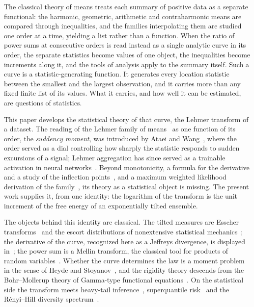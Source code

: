 \documentclass[sn-mathphys-num]{sn-jnl}
\theoremstyle{thmstyleone}%
\theoremstyle{thmstyletwo}%
\theoremstyle{thmstylethree}%
\theoremstyle{thmstyleone}%
\begin{document}
	The classical theory of means treats each summary of positive data
	as a separate functional: the harmonic, geometric, arithmetic and
	contraharmonic means are compared through inequalities, and the
	families interpolating them are studied one order at a time,
	yielding a list rather than a function. When the ratio of power sums
	at consecutive orders is read instead as a single analytic curve in
	its order, the separate statistics become values of one object, the
	inequalities become increments along it, and the tools of analysis
	apply to the summary itself. Such a curve is a statistic-generating
	function. It generates every location statistic between the smallest
	and the largest observation, and it carries more than any fixed
	finite list of its values. What it carries, and how well it can be
	estimated, are questions of statistics.
	
	This paper develops the statistical theory of that curve, the Lehmer
	transform of a dataset. The reading of the Lehmer family of
	means~\cite{lehmer1971,gini1938,hlp1934,bullen2003} as one function
	of its order, the \emph{suddency moment}, was introduced by Ataei
	and Wang~\cite{ataei2022}, where the order served as a dial
	controlling how sharply the statistic responds to sudden excursions
	of a signal; Lehmer aggregation has since served as a trainable
	activation in neural networks~\cite{ataei2025}. Beyond
	monotonicity, a formula for the derivative and a study of the
	inflection points~\cite{sluciak2015}, and a maximum weighted
	likelihood derivation of the family~\cite{ziou2024}, its theory as
	a statistical object is missing. The present work supplies it, from
	one identity: the logarithm of the transform is the unit increment
	of the free energy of an exponentially tilted ensemble.
	
	The objects behind this identity are classical. The tilted measures
	are Esscher transforms~\cite{esscher1932} and the escort
	distributions of nonextensive statistical
	mechanics~\cite{tsallis2009,beck1993,halsey1986}; the derivative of
	the curve, recognized here as a Jeffreys divergence, is displayed
	in~\cite{sluciak2015}; the power sum is a Mellin transform, the
	classical tool for products of random
	variables~\cite{springer1979,epstein1948}. Whether the curve
	determines the law is a moment problem in the sense of Heyde and
	Stoyanov~\cite{heyde1963,stoyanov2013,linstoyanov2017}, and the
	rigidity theory descends from the Bohr--Mollerup theory of
	Gamma-type functional
	equations~\cite{bohr1922,krull1948,webster1997}. On the statistical
	side the transform meets heavy-tail
	inference~\cite{hill1975,resnick2007}, superquantile
	risk~\cite{rockafellar2002} and the R\'enyi--Hill diversity
	spectrum~\cite{renyi1961,hillnumbers1973}.
	
\end{document}
